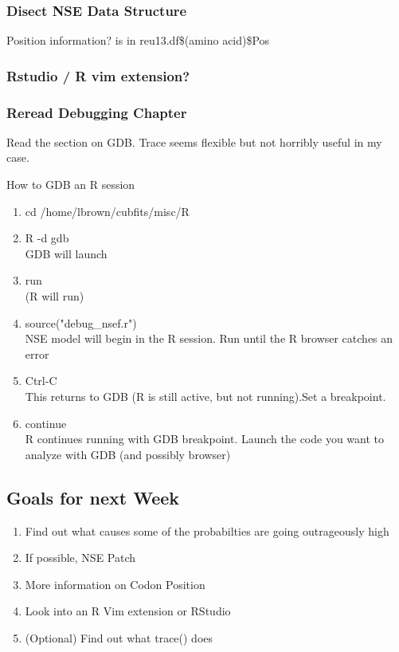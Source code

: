 \subsubsection{Disect NSE Data Structure}

Position information? is in reu13.df\$(amino acid)\$Pos

\subsubsection{Rstudio / R vim extension?}

\subsubsection{Reread Debugging Chapter}

Read the section on GDB. Trace seems flexible but not horribly useful in my case.

How to GDB an R session

\begin{enumerate}
\item cd /home/lbrown/cubfits/misc/R\\
\item R -d gdb\\
GDB will launch
\item run\\
(R will run)
\item source("debug\_nsef.r")\\
NSE model will begin in the R session. Run until the R browser catches an error
\item Ctrl-C\\
This returns to GDB (R is still active, but not running).Set a breakpoint.
\item continue\\
R continues running with GDB breakpoint. Launch the code you want to analyze with GDB (and possibly browser)
\end{enumerate}




\subsection{Goals for next Week}
\begin{enumerate}
\item Find out what causes some of the probabilties are going outrageously high
\item If possible, NSE Patch
\item More information on Codon Position
\item Look into an R Vim extension or RStudio
\item (Optional) Find out what trace() does
\end{enumerate}


